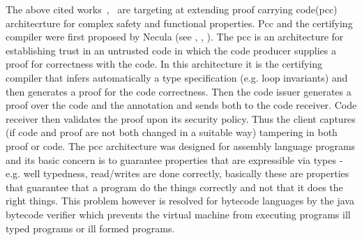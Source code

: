 The above cited works~\cite{WildmoserN-ESOP05},~\cite{BM05plb} are targeting at extending proof carrying code(pcc) architecrture for complex safety and functional properties. Pcc and the certifying compiler  were first proposed by Necula (see \cite{Necula97}, \cite{ComNec}, \cite{DesNecLee98}). The pcc is an architecture for establishing trust in an untrusted code in which the code producer supplies a proof for correctness with the code. In this architecture it is the certifying compiler that infers automatically a type specification (e.g. loop invariants) and then generates a proof for the code correctness. Then the code issuer generates a proof over the code and the annotation and sends both to the code receiver. Code receiver then validates the proof upon its security policy. Thus the client captures (if code and proof are not both changed in a suitable way) tampering in both proof or code. The pcc architecture was designed for assembly language programs and its basic concern is to guarantee properties that are expressible via types - e.g. well typedness, read/writes are done correctly, basically these are properties that guarantee that a program do the things correctly and not that it does the right things. This problem however is resolved for bytecode languages by the java bytecode verifier which prevents the virtual machine from executing programs ill typed programs or ill formed programs. 
